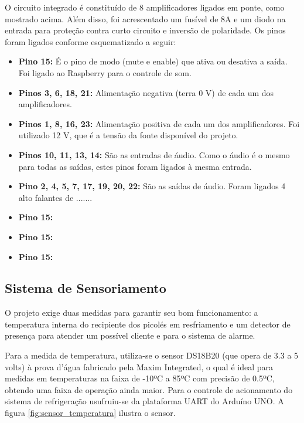 O circuito integrado é constituído de 8 amplificadores ligados em ponte, como mostrado acima. Além disso, foi acrescentado um fusível de 8A e um diodo na entrada para proteção contra curto circuito e inversão de polaridade. Os pinos foram ligados conforme esquematizado a seguir:

\begin{itemize}
	\item \textbf{Pino 15:} É o pino de modo (mute e enable) que ativa ou desativa a saída. Foi ligado ao Raspberry para o controle de som.
    \item \textbf{Pinos 3, 6, 18, 21:} Alimentação negativa (terra 0 V) de cada um dos amplificadores.
    \item \textbf{Pinos 1, 8, 16, 23:} Alimentação positiva de cada um dos amplificadores. Foi utilizado 12 V, que é a tensão da fonte disponível do projeto.
    \item \textbf{Pinos 10, 11, 13, 14:} São as entradas de áudio. Como o áudio é o mesmo para todas as saídas, estes pinos foram ligados à mesma entrada.
    \item \textbf{Pino 2, 4, 5, 7, 17, 19, 20, 22:} São as saídas de áudio. Foram ligados 4 alto falantes de .......
    
    \item \textbf{Pino 15:}
    \item \textbf{Pino 15:}
    \item \textbf{Pino 15:}
\end{itemize}

\subsection{Sistema de Sensoriamento}

O projeto exige duas medidas para garantir seu bom funcionamento: a temperatura interna do recipiente dos picolés em resfriamento e um detector de presença para atender um possível cliente e para o sistema de alarme. 

	Para a medida de temperatura, utiliza-se o sensor DS18B20 (que opera de 3.3 a 5 volts) à prova d'água fabricado pela Maxim Integrated, o qual é ideal para medidas em temperaturas na faixa de -10ºC a 85ºC com precisão de 0.5ºC, obtendo uma faixa de operação ainda maior. Para o controle de acionamento do sistema de refrigeração usufruiu-se da plataforma UART do Arduíno UNO. A figura \ref{fig:sensor_temperatura} ilustra o sensor.
    
